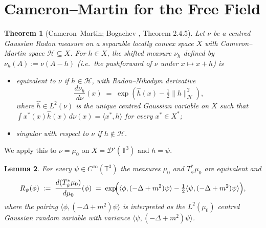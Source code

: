 \documentclass[12pt]{article}
\newtheorem{theorem}{Theorem}
\newtheorem{lemma}[theorem]{Lemma}
\theoremstyle{definition}
\begin{document}
\section{Cameron--Martin for the Free Field}

\begin{theorem}[Cameron--Martin; Bogachev \cite{Bogachev}, Theorem 2.4.5]\label{thm:CM}
Let $\nu$ be a centred Gaussian Radon measure on a separable locally convex space $X$ with
Cameron--Martin space $\mathcal{H}\subseteq X$. For $h\in X$, the shifted measure $\nu_h$
defined by $\nu_h(A):=\nu(A-h)$ (i.e.\ the pushforward of $\nu$ under $x\mapsto x+h$) is
\begin{itemize}
\item equivalent to $\nu$ if $h\in\mathcal{H}$, with Radon--Nikodym derivative
\begin{equation}\label{eq:RNCM}
\frac{d\nu_h}{d\nu}(x) \;=\; \exp\!\left(\hat h(x)-\tfrac{1}{2}\|h\|_{\mathcal{H}}^2\right),
\end{equation}
where $\hat h\in L^2(\nu)$ is the unique centred Gaussian variable on $X$ such that
$\int x^*(x)\hat h(x)\,d\nu(x)=\langle x^*,h\rangle$ for every $x^*\in X^*$;
\item singular with respect to $\nu$ if $h\notin\mathcal{H}$.
\end{itemize}
\end{theorem}

We apply this to $\nu=\mu_0$ on $X=\mathcal{D}'(\mathbb{T}^3)$ and $h=\psi$.

\begin{lemma}\label{lem:CMfree}
For every $\psi\in C^\infty(\mathbb{T}^3)$ the measures $\mu_0$ and $T_\psi^*\mu_0$ are
equivalent and
\begin{equation}\label{eq:RPsi}
R_\psi(\phi) \;:=\; \frac{d(T_\psi^*\mu_0)}{d\mu_0}(\phi)
\;=\; \exp\!\Bigl(\langle\phi,(-\Delta+m^2)\psi\rangle - \tfrac12\langle\psi,(-\Delta+m^2)\psi\rangle\Bigr),
\end{equation}
where the pairing $\langle\phi,(-\Delta+m^2)\psi\rangle$ is interpreted as the
$L^2(\mu_0)$ centred Gaussian random variable with variance
$\langle\psi,(-\Delta+m^2)\psi\rangle$.
\end{lemma}
\end{document}
